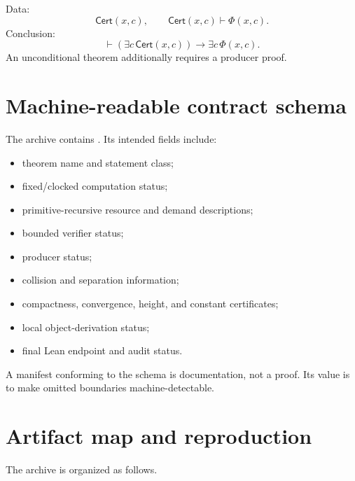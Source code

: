 Data:
\[
 \mathsf{Cert}(x,c),\qquad
 \mathsf{Cert}(x,c)\vdash\Phi(x,c).
\]
Conclusion:
\[
 \vdash (\exists c\,\mathsf{Cert}(x,c))\to\exists c\,\Phi(x,c).
\]
An unconditional theorem additionally requires a producer proof.

\section{Machine-readable contract schema}

The archive contains .  Its intended fields include:

\begin{itemize}
  \item theorem name and statement class;
  \item fixed/clocked computation status;
  \item primitive-recursive resource and demand descriptions;
  \item bounded verifier status;
  \item producer status;
  \item collision and separation information;
  \item compactness, convergence, height, and constant certificates;
  \item local object-derivation status;
  \item final Lean endpoint and audit status.
\end{itemize}

A manifest conforming to the schema is documentation, not a proof.  Its value is to make omitted boundaries machine-detectable.

\section{Artifact map and reproduction}\label{sec:artifact-map}

The archive is organized as follows.

